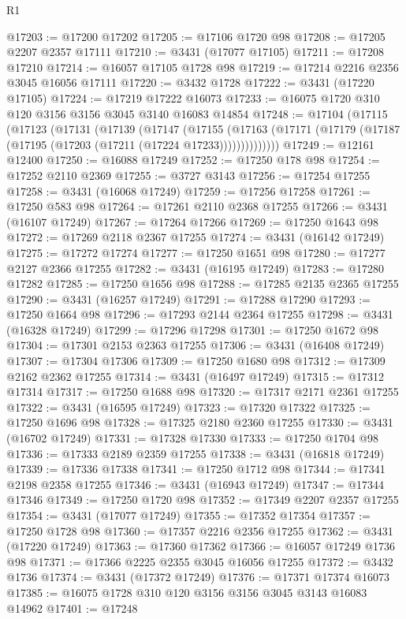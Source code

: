 \begin{lexlean}{R1}
\begin{coremodule}
@17203 := @17200 @17202
@17205 := @17106 @1720 @98
@17208 := @17205 @2207 @2357 @17111
@17210 := @3431 (@17077 @17105)
@17211 := @17208 @17210
@17214 := @16057 @17105 @1728 @98
@17219 := @17214 @2216 @2356 @3045 @16056 @17111
@17220 := @3432 @1728
@17222 := @3431 (@17220 @17105)
@17224 := @17219 @17222 @16073
@17233 := @16075 @1720 @310 @120 @3156 @3156 @3045 @3140 @16083 @14854
@17248 := @17104
    (@17115
      (@17123
        (@17131
          (@17139
            (@17147
              (@17155
                (@17163 (@17171 (@17179 (@17187 (@17195 (@17203 (@17211 (@17224 @17233))))))))))))))
@17249 := @12161 @12400
@17250 := @16088 @17249
@17252 := @17250 @178 @98
@17254 := @17252 @2110 @2369
@17255 := @3727 @3143
@17256 := @17254 @17255
@17258 := @3431 (@16068 @17249)
@17259 := @17256 @17258
@17261 := @17250 @583 @98
@17264 := @17261 @2110 @2368 @17255
@17266 := @3431 (@16107 @17249)
@17267 := @17264 @17266
@17269 := @17250 @1643 @98
@17272 := @17269 @2118 @2367 @17255
@17274 := @3431 (@16142 @17249)
@17275 := @17272 @17274
@17277 := @17250 @1651 @98
@17280 := @17277 @2127 @2366 @17255
@17282 := @3431 (@16195 @17249)
@17283 := @17280 @17282
@17285 := @17250 @1656 @98
@17288 := @17285 @2135 @2365 @17255
@17290 := @3431 (@16257 @17249)
@17291 := @17288 @17290
@17293 := @17250 @1664 @98
@17296 := @17293 @2144 @2364 @17255
@17298 := @3431 (@16328 @17249)
@17299 := @17296 @17298
@17301 := @17250 @1672 @98
@17304 := @17301 @2153 @2363 @17255
@17306 := @3431 (@16408 @17249)
@17307 := @17304 @17306
@17309 := @17250 @1680 @98
@17312 := @17309 @2162 @2362 @17255
@17314 := @3431 (@16497 @17249)
@17315 := @17312 @17314
@17317 := @17250 @1688 @98
@17320 := @17317 @2171 @2361 @17255
@17322 := @3431 (@16595 @17249)
@17323 := @17320 @17322
@17325 := @17250 @1696 @98
@17328 := @17325 @2180 @2360 @17255
@17330 := @3431 (@16702 @17249)
@17331 := @17328 @17330
@17333 := @17250 @1704 @98
@17336 := @17333 @2189 @2359 @17255
@17338 := @3431 (@16818 @17249)
@17339 := @17336 @17338
@17341 := @17250 @1712 @98
@17344 := @17341 @2198 @2358 @17255
@17346 := @3431 (@16943 @17249)
@17347 := @17344 @17346
@17349 := @17250 @1720 @98
@17352 := @17349 @2207 @2357 @17255
@17354 := @3431 (@17077 @17249)
@17355 := @17352 @17354
@17357 := @17250 @1728 @98
@17360 := @17357 @2216 @2356 @17255
@17362 := @3431 (@17220 @17249)
@17363 := @17360 @17362
@17366 := @16057 @17249 @1736 @98
@17371 := @17366 @2225 @2355 @3045 @16056 @17255
@17372 := @3432 @1736
@17374 := @3431 (@17372 @17249)
@17376 := @17371 @17374 @16073
@17385 := @16075 @1728 @310 @120 @3156 @3156 @3045 @3143 @16083 @14962
@17401 := @17248

\end{coremodule}
\end{lexlean}
